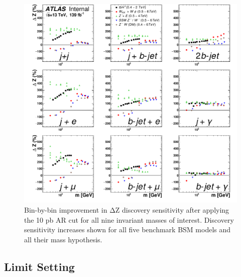 \begin{figure}[H]
    \centering
    \includegraphics[scale=0.8]{figs/ch6/results/pub_mass_BSM_significance_run.pdf}%
\caption{Bin-by-bin improvement in ΔZ discovery sensitivity after applying the 10 pb AR cut for all nine invariant masses of interest.
         Discovery sensitivity increases shown for all five benchmark BSM models and all their mass hypothesis.}
\label{fig:results-data-sig}
\end{figure}

\subsection{Limit Setting}

